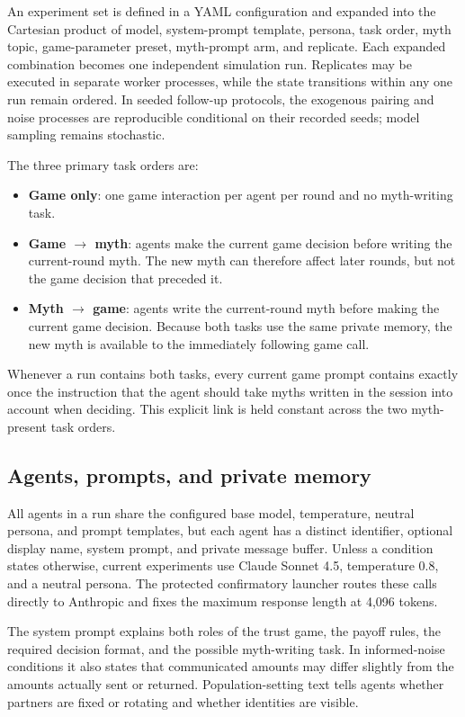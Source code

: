 An experiment set is defined in a YAML configuration and expanded into the
Cartesian product of model, system-prompt template, persona, task order, myth
topic, game-parameter preset, myth-prompt arm, and replicate. Each expanded
combination becomes one independent simulation run. Replicates may be executed
in separate worker processes, while the state transitions within any one run
remain ordered. In seeded follow-up protocols, the exogenous pairing and noise
processes are reproducible conditional on their recorded seeds; model sampling
remains stochastic.

The three primary task orders are:
\begin{itemize}
    \item \textbf{Game only}: one game interaction per agent per round and no
    myth-writing task.
    \item \textbf{Game $\rightarrow$ myth}: agents make the current game
    decision before writing the current-round myth. The new myth can therefore
    affect later rounds, but not the game decision that preceded it.
    \item \textbf{Myth $\rightarrow$ game}: agents write the current-round myth
    before making the current game decision. Because both tasks use the same
    private memory, the new myth is available to the immediately following game
    call.
\end{itemize}
Whenever a run contains both tasks, every current game prompt contains exactly
once the instruction that the agent should take myths written in the session
into account when deciding. This explicit link is held constant across the two
myth-present task orders.

\subsection{Agents, prompts, and private memory}
\label{sec:protocol-agents-memory}

All agents in a run share the configured base model, temperature, neutral
persona, and prompt templates, but each agent has a distinct identifier,
optional display name, system prompt, and private message buffer. Unless a
condition states otherwise, current experiments use Claude Sonnet 4.5,
temperature $0.8$, and a neutral persona. The protected confirmatory launcher
routes these calls directly to Anthropic and fixes the maximum response length
at 4,096 tokens.

The system prompt explains both roles of the trust game, the payoff rules, the
required decision format, and the possible myth-writing task. In informed-noise
conditions it also states that communicated amounts may differ slightly from
the amounts actually sent or returned. Population-setting text tells agents
whether partners are fixed or rotating and whether identities are visible.

